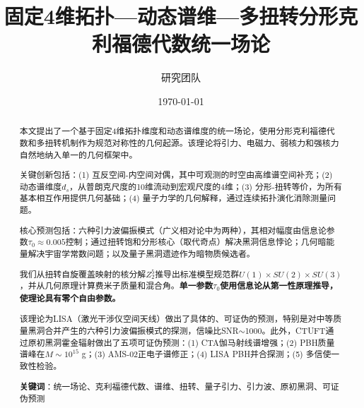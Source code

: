 \documentclass[12pt,a4paper]{revtex4-2}
\title{固定4维拓扑—动态谱维—多扭转分形克利福德代数统一场论}\\[0.5em]
\author{研究团队}
\affiliation{理论物理高级研究所}
\date{\today}
\theoremstyle{definition}
\theoremstyle{remark}
\begin{document}
\begin{abstract}
本文提出了一个基于固定4维拓扑维度和动态谱维度的统一场论，使用分形克利福德代数和多扭转机制作为规范对称性的几何起源。该理论将引力、电磁力、弱核力和强核力自然地纳入单一的几何框架中。

关键创新包括：(1) 互反空间-内空间对偶，其中可观测的时空由高维谱空间补充；(2) 动态谱维度$d_s$，从普朗克尺度的10维流动到宏观尺度的4维；(3) 分形-扭转等价，为所有基本相互作用提供几何基础；(4) 量子力学的几何解释，通过连续拓扑演化消除测量问题。

核心预测包括：六种引力波偏振模式（广义相对论中为两种），其相对幅度由信息论参数$\tau_0 \approx 0.005$控制；通过扭转饱和分形核心（取代奇点）解决黑洞信息悖论；几何暗能量解决宇宙学常数问题；以及量子黑洞遗迹作为暗物质候选者。

我们从扭转自旋覆盖映射的核分解$Z_2^5$推导出标准模型规范群$U(1) \times SU(2) \times SU(3)$，并从几何原理计算费米子质量和混合角。\textbf{单一参数$\tau_0$使用信息论从第一性原理推导，使理论具有零个自由参数。}

该理论为LISA（激光干涉仪空间天线）做出了具体的、可证伪的预测，特别是对中等质量黑洞合并产生的六种引力波偏振模式的探测，信噪比SNR$\sim$1000。此外，CTUFT通过原初黑洞霍金辐射做出了五项可证伪预测：(1) CTA伽马射线谱增强；(2) PBH质量谱峰在$M \sim 10^{15}$ g；(3) AMS-02正电子谱修正；(4) LISA PBH并合探测；(5) 多信使一致性检验。

\textbf{关键词}：统一场论、克利福德代数、谱维、扭转、量子引力、引力波、原初黑洞、可证伪预测
\end{abstract}

\maketitle

\tableofcontents
\newpage


































\end{document}
